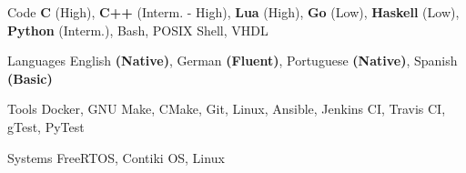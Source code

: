 
\begin{cvskills}
  \cvskill
    {Code} %
    {\textbf{C} (High),
     \textbf{C++} (Interm. - High),
     \textbf{Lua} (High),
     \textbf{Go} (Low),
     \textbf{Haskell} (Low),
     \textbf{Python} (Interm.),
     Bash, POSIX Shell,
     VHDL}

  \cvskill
    {Languages} %
    {English \textbf{(Native)}, German \textbf{(Fluent)}, Portuguese \textbf{(Native)}, Spanish \textbf{(Basic)}} %

  \cvskill
    {Tools} %
    {Docker, GNU Make, CMake, Git, Linux, Ansible, Jenkins CI, Travis CI, gTest, PyTest} %

  \cvskill
    {Systems} %
    {FreeRTOS, Contiki OS, Linux} %
\end{cvskills}
